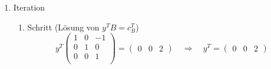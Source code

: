 \documentclass[a4paper]{scrartcl}
\begin{document}
\begin{enumerate}[label=\bfseries\arabic*.]
\begin{enumerate}
\begin{enumerate}[1.]
                    \item Iteration
                        \begin{enumerate}[1.]
                            \item Schritt (Lösung von $y^TB = c_B^T$)
                                \begin{equation}
                                    y^T
                                    \begin{pmatrix}
                                        1 & 0 & -1 \\
                                        0 & 1 & 0 \\
                                        0 & 0 & 1 \\
                                    \end{pmatrix}
                                    =
                                    \begin{pmatrix}
                                        0 & 0 & 2
                                    \end{pmatrix}
                                    \quad\Rightarrow\quad
                                    y^T =
                                    \begin{pmatrix}
                                        0 & 0 & 2
                                    \end{pmatrix}
                                \end{equation}
                                

\end{enumerate}
\end{enumerate}
\end{enumerate}
\end{enumerate}
\end{document}
